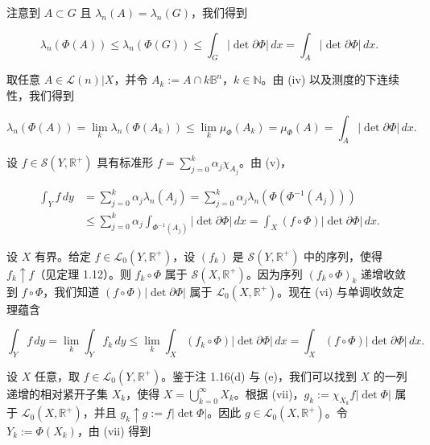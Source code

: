 \begin{proposition}
\begin{subitems}
注意到 $ A \subset G $ 且 $ \lambda_{n}(A) = \lambda_{n}(G) $，我们得到

\[
\lambda_{n}(\Phi(A)) \le \lambda_{n}(\Phi(G)) \le \int_{G} |\det \partial\Phi| \, dx = \int_{A} |\det \partial\Phi| \, dx .
\]
\item

取任意 $ A \in \mathcal{L}(n)|X $，并令 $ A_{k} := A \cap k\mathbb{B}^{n} $，$ k \in \mathbb{N} $。由 (iv) 以及测度的下连续性，我们得到

\[
\lambda_{n}(\Phi(A)) = \lim_{k} \lambda_{n}(\Phi(A_{k})) \le \lim_{k} \mu_{\Phi}(A_{k}) = \mu_{\Phi}(A) = \int_{A} |\det \partial\Phi| \, dx .
\]
\item

设 $ f \in \mathcal{S}(Y, \mathbb{R}^{+}) $ 具有标准形 $ f = \sum_{j=0}^{k} \alpha_{j}\chi_{A_{j}} $。由 (v)，

\begin{equation*}
\begin{aligned}
\int_{Y} f \, dy &= \sum_{j=0}^{k} \alpha_{j}\lambda_{n}(A_{j}) = \sum_{j=0}^{k} \alpha_{j}\lambda_{n}(\Phi(\Phi^{-1}(A_{j}))) \\ &\le \sum_{j=0}^{k} \alpha_{j} \int_{\Phi^{-1}(A_{j})} |\det \partial\Phi| \, dx = \int_{X} (f \circ \Phi)|\det \partial\Phi| \, dx .
\end{aligned}
\end{equation*}
\item

设 $ X $ 有界。给定 $ f \in \mathcal{L}_{0}(Y, \mathbb{R}^{+}) $，设 $ (f_{k}) $ 是 $ \mathcal{S}(Y, \mathbb{R}^{+}) $ 中的序列，使得 $ f_{k} \uparrow f $（见定理 1.12）。则 $ f_{k} \circ \Phi $ 属于 $ \mathcal{S}(X, \mathbb{R}^{+}) $。因为序列 $ (f_{k} \circ \Phi)_{k} $ 递增收敛到 $ f \circ \Phi $，我们知道 $ (f \circ \Phi)|\det \partial\Phi| $ 属于 $ \mathcal{L}_{0}(X, \mathbb{R}^{+}) $。现在 (vi) 与单调收敛定理蕴含

\[
\int_{Y} f \, dy = \lim_{k} \int_{Y} f_{k} \, dy \le \lim_{k} \int_{X} (f_{k} \circ \Phi)|\det \partial\Phi| \, dx = \int_{X} (f \circ \Phi)|\det \partial\Phi| \, dx .
\]
\item

设 $ X $ 任意，取 $ f \in \mathcal{L}_{0}(Y, \mathbb{R}^{+}) $。鉴于注 1.16(d) 与 (e)，我们可以找到 $ X $ 的一列递增的相对紧开子集 $ X_{k} $，使得 $ X = \bigcup_{k=0}^{\infty} X_{k} $。根据 (vii)，$ g_{k} := \chi_{X_{k}} f|\det \Phi| $ 属于 $ \mathcal{L}_{0}(X, \mathbb{R}^{+}) $，并且 $ g_{k} \uparrow g := f|\det \Phi| $。因此 $ g \in \mathcal{L}_{0}(X, \mathbb{R}^{+}) $。令 $ Y_{k} := \Phi(X_{k}) $，由 (vii) 得到


\end{subitems}
\end{proposition}
